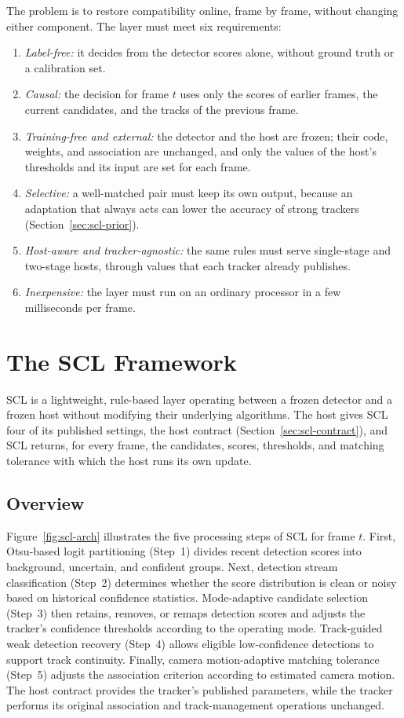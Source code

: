 The problem is to restore compatibility online, frame by frame, without changing either component. The layer must meet six requirements:
\begin{enumerate}
\item \emph{Label-free:} it decides from the detector scores alone, without ground truth or a calibration set.
\item \emph{Causal:} the decision for frame $t$ uses only the scores of earlier frames, the current candidates, and the tracks of the previous frame.
\item \emph{Training-free and external:} the detector and the host are frozen; their code, weights, and association are unchanged, and only the values of the host's thresholds and its input are set for each frame.
\item \emph{Selective:} a well-matched pair must keep its own output, because an adaptation that always acts can lower the accuracy of strong trackers (Section~\ref{sec:scl-prior}).
\item \emph{Host-aware and tracker-agnostic:} the same rules must serve single-stage and two-stage hosts, through values that each tracker already publishes.
\item \emph{Inexpensive:} the layer must run on an ordinary processor in a few milliseconds per frame.
\end{enumerate}

\section{The SCL Framework}\label{sec:scl}
SCL is a lightweight, rule-based layer operating between a frozen detector and a frozen host without modifying their underlying algorithms. The host gives SCL four of its published settings, the host contract (Section~\ref{sec:scl-contract}), and SCL returns, for every frame, the candidates, scores, thresholds, and matching tolerance with which the host runs its own update.

\subsection{Overview}\label{sec:scl-overview}
Figure~\ref{fig:scl-arch} illustrates the five processing steps of SCL for frame $t$. First, Otsu-based logit partitioning (Step~1) divides recent detection scores into background, uncertain, and confident groups. Next, detection stream classification (Step~2) determines whether the score distribution is clean or noisy based on historical confidence statistics. Mode-adaptive candidate selection (Step~3) then retains, removes, or remaps detection scores and adjusts the tracker's confidence thresholds according to the operating mode. Track-guided weak detection recovery (Step~4) allows eligible low-confidence detections to support track continuity. Finally, camera motion-adaptive matching tolerance (Step~5) adjusts the association criterion according to estimated camera motion. The host contract provides the tracker's published parameters, while the tracker performs its original association and track-management operations unchanged.

